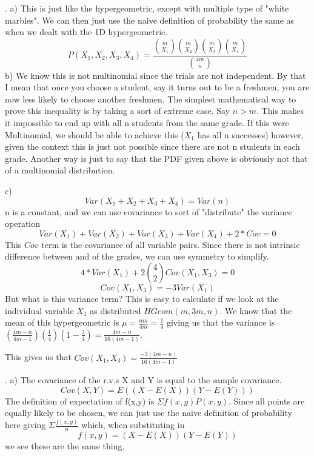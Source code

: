 \documentclass[11pt]{article}
\begin{document}
\bigskip


. 
\smallskip	a) This is just like the hypergeometric, except with multiple type of "white marbles". We can then just use the naive 				definition of probability the same as when we dealt with the 1D hypergeometric. 
			$$ \boxed{ P(X_1, X_2, X_3, X_4) = \frac{\binom{m}{X_1}\binom{m}{X_2}\binom{m}{X_3}\binom{m}{X_4}}{\binom{4m}{n}} }$$ 
\smallskip
			b) We know this is not multinomial since the trials are not independent.  By that I mean that once you choose a student, say it turns out to be a freshmen, you are now less likely to choose another freshmen. The simplest mathematical way to prove this inequality is by taking a sort of extreme case. 
			Say $n>m$.  This makes it impossible to end up with all n students from the same grade. If this were Multinomial, we should be able to achieve this ($X_1$ has all n successes) however, given the context this is just not possible since there are not n students in each grade.  Another way is just to say that the PDF given above is obviously not that of a multinomial distribution.  

\smallskip
			c) $$Var(X_1 + X_2 + X_3 + X_4) = Var(n)$$
				n is a constant, and we can use covariance to sort of "distribute" the variance operation
				$$ Var(X_1) + Var(X_2) + Var(X_3) + Var(X_4) + 2*Cov = 0$$
				This $Cov$ term is the covariance of all variable pairs.  Since there is not intrinsic difference between and of the grades, we can use symmetry to simplify.
				$$ 4*Var(X_1) + 2\binom{4}{2}Cov(X_1, X_3) = 0$$
				$$ Cov(X_1,X_3) = -3Var(X_1)$$
				But what is this variance term?  This is easy to calculate if we look at the individual variable $X_1$ as distributed $HGeom(m, 3m, n)$.  We know that the mean of this hypergeometric is $\mu = \frac{nm}{4m}=\frac{1}{4}$ giving us that the variance is $(\frac{4m-n}{4m-1})(\frac{1}{4})(1-\frac{3}{4}) = \frac{4m-n}{16(4m-1)}$.  
				
				This gives us that $ \boxed{ Cov(X_1,X_3) = \frac{-3(4m-n)}{16(4m-1)} }$

	
\bigskip


. 
	a) The covariance of the r.v.s X and Y is equal to the sample covariance. 
		$$ Cov(X,Y) = E((X-E(X))(Y-E(Y)))$$
		The definition of expectation of f(x,y) is $\Sigma f(x,y)P(x,y)$.  Since all points are equally likely to be chosen, we can just use the naive definition of probability here giving $\Sigma \frac{f(x,y)}{n}$ which, when substituting in $$f(x,y) = (X-E(X))(Y-E(Y))$$
		we see these are the same thing.
\smallskip
\end{document}
